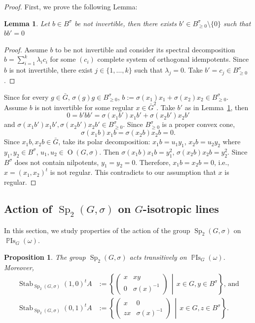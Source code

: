 \documentclass[a4paper,oneside,11pt]{amsart}
\DeclareMathOperator{\Sp}{Sp}
\DeclareMathOperator{\OO}{O}
\DeclareMathOperator{\Stab}{Stab}
\DeclareMathOperator{\PIs}{\mathbb{P}Is}
\newcommand{\midwd}{\,\middle\vert\,}
\theoremstyle{plain}
\newtheorem{lem}[teo]{Lemma}
\newtheorem{prop}[teo]{Proposition}
\theoremstyle{definition}
\theoremstyle{remark}
\newcommand{\bs}{\setminus}
\begin{document}
\begin{proof} First, we prove the following Lemma:
\begin{lem}\label{lem:invert}
Let $b\in B^{\sigma}$ be not invertible, then there exists $b'\in B^{\sigma}_{\geq 0}\bs\{0\}$ such that $bb'=0$
\end{lem}

\begin{proof}
Assume $b$ to be not invertible and consider its spectral decomposition $b=\sum_{i=1}^k\lambda_ic_i$ for some $(c_i)$ complete system of orthogonal idempotents. Since $b$ is not invertible, there exist $j\in\{1,\dots,k\}$ such that $\lambda_j=0$. Take $b'=c_j\in B^{\sigma}_{\geq 0}$.
\end{proof}

Since for every $g\in\bar G$, $\sigma(g)g\in B^{\sigma}_{\geq 0}$, $b:=\sigma(x_1)x_1+\sigma(x_2)x_2\in B^{\sigma}_{\geq 0}$. Assume $b$ is not invertible for some regular $x\in \bar G^2$. Take $b'$ as in Lemma~\ref{lem:invert}, then
$$0=b'bb'=\sigma(x_1b')x_1b'+\sigma(x_2b')x_2b'$$
and $\sigma(x_1b')x_1b', \sigma(x_2b')x_2b'\in B^{\sigma}_{\geq 0}$. Since $B^{\sigma}_{\geq 0}$ is a proper convex cone, 
$$\sigma(x_1b)x_1b = \sigma(x_2b)x_2b=0.$$
Since $x_1b,x_2b\in\bar G$, take its polar decomposition: $x_1b=u_1y_1$, $x_2b=u_2y_2$ where $y_1,y_2\in B^{\sigma}$, $u_1,u_2\in \OO(G,\sigma)$. Then $\sigma(x_1b)x_1b=y_1^2$, $\sigma(x_2b)x_2b=y_2^2$. Since $B^{\sigma}$ does not contain nilpotents, $y_1=y_2=0$. Therefore, $x_1b=x_2b=0$, i.e., $x=(x_1,x_2)^t$ is not regular. This contradicts to our assumption that $x$ is regular.
\end{proof}


\subsection{Action of \texorpdfstring{$\Sp_2(G,\sigma)$}{Sp2(G,sigma)} on \texorpdfstring{$G$}{G}-isotropic lines}

In this section, we study properties of the action of the group $\Sp_2(G,\sigma)$ on $\PIs_G(\omega)$.

\begin{prop}\label{stab1} The group $\Sp_2(G,\sigma)$ acts transitively on $\PIs_G(\omega)$. Moreover,
\begin{align*}
    \Stab_{\Sp_2(G,\sigma)}(1,0)^tA&:=\left\{
\begin{pmatrix}
x & xy \\
0 & \sigma(x)^{-1}
\end{pmatrix}
\midwd
x\in G, y\in B^{\sigma}
\right\}\text{, and}\\
\Stab_{\Sp_2(G,\sigma)}(0,1)^tA&:=\left\{
\begin{pmatrix}
x & 0 \\
zx & \sigma(x)^{-1}
\end{pmatrix}
\midwd
x\in G, z\in B^{\sigma}
\right\}.
\end{align*}


\end{prop}
\end{document}
